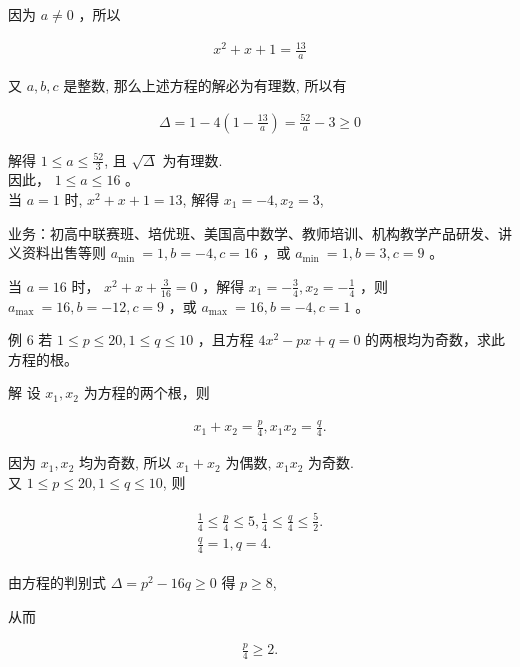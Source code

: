 \documentclass[10pt]{article}
\begin{document}
因为 $a \neq 0$ ，所以

\begin{align*}
x^{2}+x+1=\frac{13}{a}
\end{align*}

又 $a, b, c$ 是整数, 那么上述方程的解必为有理数, 所以有

\begin{align*}
\Delta=1-4\left(1-\frac{13}{a}\right)=\frac{52}{a}-3 \geqslant 0
\end{align*}

解得 $1 \leqslant a \leqslant \frac{52}{3}$, 且 $\sqrt{\Delta}$ 为有理数.\\
因此， $1 \leqslant a \leqslant 16$ 。\\
当 $a=1$ 时, $x^{2}+x+1=13$, 解得 $x_{1}=-4, x_{2}=3$,

业务：初高中联赛班、培优班、美国高中数学、教师培训、机构教学产品研发、讲义资料出售等则 $a_{\text {min }}=1, b=-4, c=16$ ，或 $a_{\text {min }}=1, b=3, c=9$ 。

当 $a=16$ 时， $x^{2}+x+\frac{3}{16}=0$ ，解得 $x_{1}=-\frac{3}{4}, x_{2}=-\frac{1}{4}$ ，则 $a_{\text {max }}=16, b=-12, c=9$ ，或 $a_{\text {max }}=16, b=-4, c=1$ 。

例 6 若 $1 \leqslant p \leqslant 20,1 \leqslant q \leqslant 10$ ，且方程 $4 x^{2}-p x+q=0$ 的两根均为奇数，求此方程的根。

解 设 $x_{1}, x_{2}$ 为方程的两个根，则

\begin{align*}
x_{1}+x_{2}=\frac{p}{4}, x_{1} x_{2}=\frac{q}{4} .
\end{align*}

因为 $x_{1}, x_{2}$ 均为奇数, 所以 $x_{1}+x_{2}$ 为偶数, $x_{1} x_{2}$ 为奇数.\\
又 $1 \leqslant p \leqslant 20,1 \leqslant q \leqslant 10$, 则

\begin{align*}
\begin{gathered}
\frac{1}{4} \leqslant \frac{p}{4} \leqslant 5, \frac{1}{4} \leqslant \frac{q}{4} \leqslant \frac{5}{2} . \\
\frac{q}{4}=1, q=4 .
\end{gathered}
\end{align*}

由方程的判别式 $\Delta=p^{2}-16 q \geqslant 0$ 得 $p \geqslant 8$,

从而

\begin{align*}
\frac{p}{4} \geqslant 2 .
\end{align*}
\end{document}
